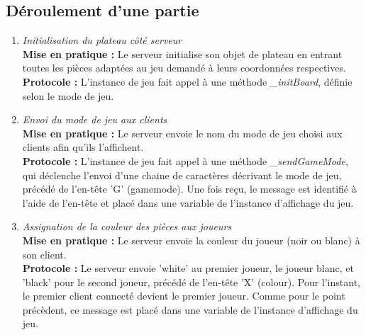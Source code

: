 \documentclass[10pt, a4paper]{article}
\begin{document}
\subsection{Déroulement d'une partie}
\begin{enumerate}

\item \textit{Initialisation du plateau côté serveur}\\
\textbf{Mise en pratique :} Le serveur initialise son objet de plateau en entrant toutes les pièces adaptées au jeu demandé à leurs coordonnées respectives.\\
\textbf{Protocole :} L'instance de jeu fait appel à une méthode \textit{\_initBoard}, définie selon le mode de jeu.

\item \textit{Envoi du mode de jeu aux clients}\\
\textbf{Mise en pratique :} Le serveur envoie le nom du mode de jeu choisi aux clients afin qu'ils l'affichent.\\
\textbf{Protocole :} L'instance de jeu fait appel à une méthode \textit{\_sendGameMode}, qui déclenche l'envoi d'une chaine de caractères décrivant le mode de jeu, précédé de l'en-tête 'G' (gamemode). Une fois reçu, le message est identifié à l'aide de l'en-tête et placé dans une variable de l'instance d'affichage du jeu.

\item \textit{Assignation de la couleur des pièces aux joueurs} \\
\textbf{Mise en pratique :} Le serveur envoie la couleur du joueur (noir ou blanc) à son client. \\
\textbf{Protocole :} Le serveur envoie 'white' au premier joueur, le joueur blanc, et 'black' pour le second joueur, précédé de l'en-tête 'X' (colour). Pour l'instant, le premier client connecté devient le premier joueur.  Comme pour le point précèdent, ce message est placé dans une variable de l'instance d'affichage du jeu.


\end{enumerate}
\end{document}
